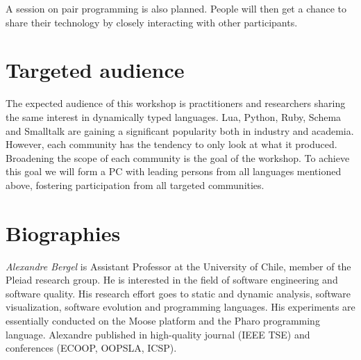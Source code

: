 \documentclass[runningheads]{llncs}
\newcommand\AK[1]{\nb{akuhn}{#1}}
\begin{document}
A session on pair programming is also planned. People will then get a chance to share their technology by closely interacting with other participants. 


\section{Targeted audience}

The expected audience of this workshop is practitioners and researchers sharing the same interest in dynamically typed languages. Lua, Python, Ruby, Schema and Smalltalk are gaining a significant popularity both in industry and academia. However, each community has the tendency to only look at what it produced. Broadening the scope of each community is the goal of the workshop. To achieve this goal we will form a PC with leading persons from all languages mentioned above, fostering participation from all targeted communities.


\section{Biographies}

\noindent \emph{Alexandre Bergel} is Assistant Professor at the University of Chile, member of the Pleiad research group. He is interested in the field of software engineering and software quality. His research effort goes to static and dynamic analysis, software visualization, software evolution and programming languages. His experiments are essentially conducted on the Moose platform and the Pharo programming language. Alexandre published in high-quality journal (IEEE TSE) and conferences (ECOOP, OOPSLA, ICSP).\\

\end{document}
